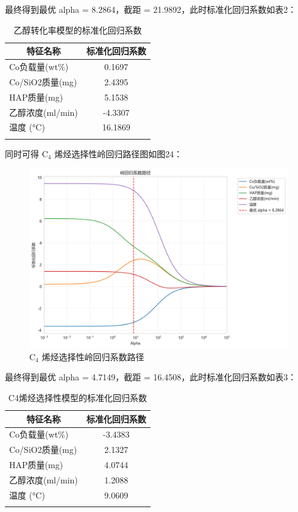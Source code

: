 最终得到最优 alpha = 8.2864，截距 = 21.9892，此时标准化回归系数如表2：

\newpage

\begin{table}[!htbp]
	\caption{乙醇转化率模型的标准化回归系数}
	\centering
	\begin{tabular}{l c}
		\hline
		\multicolumn{1}{c}{\textbf{特征名称}} & \textbf{标准化回归系数} \\
		\hline
		Co负载量(wt\%)      & 0.1697 \\
		Co/SiO2质量(mg)     & 2.4395 \\
		HAP质量(mg)         & 5.1538 \\
		乙醇浓度(ml/min)    & -4.3307 \\
		温度 (°C)                & 16.1869 \\
		\hline
		\label{tab:ridge_coefficients}
	\end{tabular}
\end{table}



同时可得 \( \text{C}_4 \) 烯烃选择性岭回归路径图如图24：
\begin{figure}[h]%
	\centering%
	\includegraphics [scale=0.6]{图/ling-xuanzexing.png}
	\caption{ \( \text{C}_4 \) 烯烃选择性岭回归系数路径} 
	\label{fig:1}
\end{figure}

最终得到最优 alpha = 4.7149，截距 = 16.4508，此时标准化回归系数如表3：

\begin{table}[!htbp]
	\caption{C4烯烃选择性模型的标准化回归系数}
	\centering
	\begin{tabular}{l c}
		\hline
		\multicolumn{1}{c}{\textbf{特征名称}} & \textbf{标准化回归系数} \\
		\hline
		Co负载量(wt\%)      & -3.4383 \\
		Co/SiO2质量(mg)     & 2.1327 \\
		HAP质量(mg)         & 4.0744 \\
		乙醇浓度(ml/min)    & 1.2088 \\
		温度 (°C)               & 9.0609 \\
		\hline
		\label{tab:ridge_selectivity}
	\end{tabular}
\end{table}

